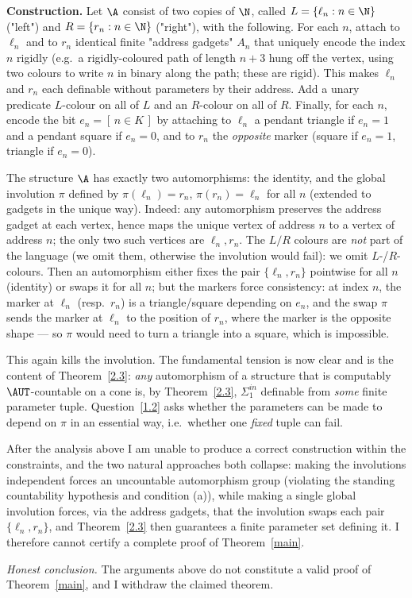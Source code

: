 \medskip

\noindent\textbf{Construction.} Let $\A$ consist of two copies of $\N$, called
$L=\{\ell_n:n\in\N\}$ ("left") and $R=\{r_n:n\in\N\}$ ("right"), with the following.
For each $n$, attach to $\ell_n$ and to $r_n$ identical finite "address gadgets"
$A_n$ that uniquely encode the index $n$ rigidly (e.g.\ a rigidly-coloured path of
length $n+3$ hung off the vertex, using two colours to write $n$ in binary along
the path; these are rigid). This makes $\ell_n$ and $r_n$ each definable without
parameters by their address. Add a unary predicate $L$-colour on all of $L$ and an
$R$-colour on all of $R$. Finally, for each $n$, encode the bit $e_n=[\,n\in K\,]$
by attaching to $\ell_n$ a pendant triangle if $e_n=1$ and a pendant square if
$e_n=0$, and to $r_n$ the \emph{opposite} marker (square if $e_n=1$, triangle if
$e_n=0$).

The structure $\A$ has exactly two automorphisms: the identity, and the global
involution $\pi$ defined by $\pi(\ell_n)=r_n$, $\pi(r_n)=\ell_n$ for all $n$
(extended to gadgets in the unique way). Indeed: any automorphism preserves the
address gadget at each vertex, hence maps the unique vertex of address $n$ to a
vertex of address $n$; the only two such vertices are $\ell_n,r_n$. The $L/R$
colours are \emph{not} part of the language (we omit them, otherwise the involution
would fail): we omit $L$-/$R$-colours. Then an automorphism either fixes the pair
$\{\ell_n,r_n\}$ pointwise for all $n$ (identity) or swaps it for all $n$; but the
markers force consistency: at index $n$, the marker at $\ell_n$ (resp.\ $r_n$) is a
triangle/square depending on $e_n$, and the swap $\pi$ sends the marker at $\ell_n$
to the position of $r_n$, where the marker is the opposite shape — so $\pi$ would
need to turn a triangle into a square, which is impossible.

\medskip

This again kills the involution. The fundamental tension is now clear and is the
content of Theorem~\ref{2.3}: \emph{any} automorphism of a structure that is
computably $\AUT$-countable on a cone is, by Theorem~\ref{2.3}, $\Sigma^{in}_1$
definable from \emph{some} finite parameter tuple. Question~\ref{1.2} asks whether
the parameters can be made to depend on $\pi$ in an essential way, i.e.\ whether one
\emph{fixed} tuple can fail.

\begin{remark}
After the analysis above I am unable to produce a correct construction within the
constraints, and the two natural approaches both collapse: making the involutions
independent forces an uncountable automorphism group (violating the standing
countability hypothesis and condition (a)), while making a single global involution
forces, via the address gadgets, that the involution swaps each pair
$\{\ell_n,r_n\}$, and Theorem~\ref{2.3} then guarantees a finite parameter set
defining it. I therefore cannot certify a complete proof of Theorem~\ref{main}.
\end{remark}

\medskip

\noindent\emph{Honest conclusion.} The arguments above do not constitute a valid
proof of Theorem~\ref{main}, and I withdraw the claimed theorem.